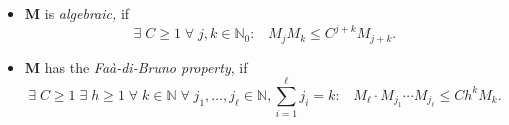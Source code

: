 \documentclass[11pt,a4paper]{article}
\makeatletter
\theoremstyle{plain}
\theoremstyle{definition}
\DeclareRobustCommand\widecheck[1]{{\mathpalette\@widecheck{#1}}}
\def\@widecheck#1#2{%
	\setbox\z@\hbox{\m@th$#1#2$}%
	\setbox\tw@\hbox{\m@th$#1%
		\widehat{%
			\vrule\@width\z@\@height\ht\z@
			\vrule\@height\z@\@width\wd\z@}$}%
	\dp\tw@-\ht\z@
	\@tempdima\ht\z@ \advance\@tempdima2\ht\tw@ \divide\@tempdima\thr@@
	\setbox\tw@\hbox{%
		 \raise\@tempdima\hbox{\scalebox{1}[-1]{\lower\@tempdima\box
				\tw@}}}%
	{\ooalign{\box\tw@ \cr \box\z@}}}
\renewcommand{\check}[1]{\widecheck{#1}}
\renewcommand{\widecheck}[1]{\widecheck{#1}}
\newcommand{\NN}{\mathbb{N}}
\newcommand{\M}{\mathbf{M}}
\let\on=\operatorname
\DeclareRobustCommand\widecheck[1]{{\mathpalette\@widecheck{#1}}}
\def\@widecheck#1#2{%
    \setbox\z@\hbox{\m@th$#1#2$}%
    \setbox\tw@\hbox{\m@th$#1%
       \widehat{%
          \vrule\@width\z@\@height\ht\z@
          \vrule\@height\z@\@width\wd\z@}$}%
    \dp\tw@-\ht\z@
    \@tempdima\ht\z@ \advance\@tempdima2\ht\tw@ \divide\@tempdima\thr@@
    \setbox\tw@\hbox{%
       \raise\@tempdima\hbox{\scalebox{1}[-1]{\lower\@tempdima\box
\tw@}}}%
    {\ooalign{\box\tw@ \cr \box\z@}}}
\makeatother
\begin{document}
\begin{itemize}
	\item[\hypertarget{s-alg}{$(\on{alg})$}] $\M$ {is} {\itshape algebraic,} if
$$\exists\;C\ge 1\;\forall\;j,k\in\NN_0:\;\;\;M_j M_k\le C^{j+k}M_{j+k}.$$

\item[\hypertarget{s-FdB}{$(\on{FdB})$}] $\M$ has the {\itshape Fa\`{a}-di-Bruno property}, if
$$\exists\;C\ge 1\;\exists\;h\ge 1\;\forall\;k\in\NN \;\forall\;j_1,\dots,j_\ell\in\NN, \sum_{i=1}^{\ell}j_i=k:\;\;\;M_\ell\cdot M_{j_1}\cdots M_{j_{\ell}}\le Ch^kM_k.$$
\end{itemize}
\end{document}

